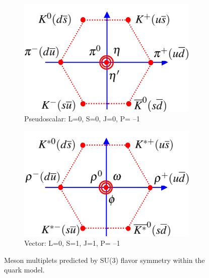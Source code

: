 \begin{figure}
\centering
\begin{subfigure}[c]{0.425\textwidth}
\includegraphics[width=0.95\textwidth]{figs/pseudoscalarmesons.png}
\caption{Pseudoscalar: L=0, S=0, J=0, P= –1}
\end{subfigure}
\begin{subfigure}[c]{0.425\textwidth}
\includegraphics[width=0.95\textwidth]{figs/vectormesons.png}
\caption{Vector: L=0, S=1, J=1, P= –1}
\end{subfigure}
\caption[Meson multiplets predicted by SU(3) flavor symmetry within the quark model.]{Meson multiplets predicted by SU(3) flavor symmetry within the quark model. \cite{thomsonpics}}
\label{fig:su3meson}


\end{figure}
